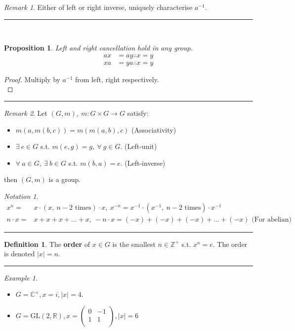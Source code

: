 \documentclass{article}
\newtheorem{theorem}{Proposition}[section]
\theoremstyle{definition}
\newtheorem{definition}{Definition}[section]
\theoremstyle{remark}
\newtheorem*{remark}{Remark}
\newtheorem*{example}{Example}
\newtheorem*{notation}{Notation}
\begin{document}
\begin{remark}
\vspace{1mm}Either of left or right inverse, uniquely characterise $a^{-1}$.\\
\end{remark}
\hrule
\vspace{3mm}~\\
\begin{theorem}
Left and right cancellation hold in any group.
\begin{align}
ax&=ay\therefore x=y\\
xa&=ya\therefore x=y
\end{align}
\end{theorem}
\begin{proof}
Multiply by $a^{-1}$ from left, right respectively.\\
\end{proof}
\hrule
\begin{remark}
\vspace{1mm}Let  $(G, m),~m:G\times G \rightarrow G$ satisfy:\\
\begin{itemize}
\item $m(a, m(b,c))=m(m(a,b),c)$ (Associativity)
\item $\exists~e\in G$ s.t. $m(e,g)=g,~\forall~g\in G$. (Left-unit)
\item $\forall ~ a \in G,~\exists~b\in G$ s.t. $m(b,a)=e$. (Left-inverse)
\end{itemize}
then $(G,m)$ is a group.\\
\end{remark}
\begin{notation}
\begin{align}
x^n=&x\cdot (x, ~ n-2 \text{ times}) \cdot x,~x^{-n}=x^{-1}\cdot (x^{-1}, ~ n-2 \text{ times}) \cdot x^{-1}\\
n\cdot x=&x+x+x+...+x,~-n\cdot x = (-x)+(-x)+(-x)+...+(-x) \text{ (For abelian)}
\end{align}
\end{notation}
\hrule
\begin{definition}
The \textbf{order} of $x\in G$ is the smallest $n\in \mathbb{Z}^+$ s.t. $x^n=e$. The order is denoted $|x|= n$.\\
\end{definition}
\hrule
\begin{example}
\begin{itemize}
\item $G=\mathbb{C}^{\times}, x=i, |x|=4.$
\item $G=\mathrm{GL}(2,\mathbb{R}), x=\begin{pmatrix}0&-1\\1&1\\\end{pmatrix}, |x|=6$
\end{itemize}
\end{example}
\newpage
\end{document}
